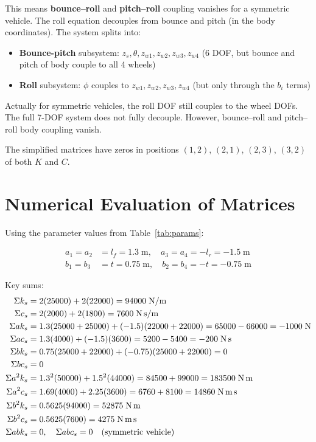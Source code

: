 \documentclass[11pt]{article}
\def\vect#1{#1}%
\newcommand{\vect}[1]{\bm{#1}}
\begin{document}
This means \textbf{bounce--roll} and \textbf{pitch--roll} coupling vanishes for a symmetric vehicle. The roll equation decouples from bounce and pitch (in the body coordinates). The system splits into:
\begin{itemize}[nosep]
  \item \textbf{Bounce-pitch} subsystem: $z_s, \theta, z_{w1}, z_{w2}, z_{w3}, z_{w4}$ (6 DOF, but bounce and pitch of body couple to all 4 wheels)
  \item \textbf{Roll} subsystem: $\phi$ couples to $z_{w1}, z_{w2}, z_{w3}, z_{w4}$ (but only through the $b_i$ terms)
\end{itemize}

Actually for symmetric vehicles, the roll DOF still couples to the wheel DOFs. The full 7-DOF system does not fully decouple. However, bounce--roll and pitch--roll body coupling vanish.

The simplified matrices have zeros in positions $(1,2)$, $(2,1)$, $(2,3)$, $(3,2)$ of both $\vect{K}$ and $\vect{C}$.

\section{Numerical Evaluation of Matrices}

Using the parameter values from Table~\ref{tab:params}:

\begin{align}
a_1 = a_2 &= l_f = 1.3\;\text{m}, \quad a_3 = a_4 = -l_r = -1.5\;\text{m} \\
b_1 = b_3 &= t = 0.75\;\text{m}, \quad b_2 = b_4 = -t = -0.75\;\text{m}
\end{align}

Key sums:
\begin{align}
\Sigma k_s &= 2(25000) + 2(22000) = 94000 \;\text{N/m} \\
\Sigma c_s &= 2(2000) + 2(1800) = 7600 \;\text{N\,s/m} \\
\Sigma a k_s &= 1.3(25000+25000) + (-1.5)(22000+22000) = 65000 - 66000 = -1000 \;\text{N} \\
\Sigma a c_s &= 1.3(4000) + (-1.5)(3600) = 5200 - 5400 = -200 \;\text{N\,s} \\
\Sigma b k_s &= 0.75(25000+22000) + (-0.75)(25000+22000) = 0 \\
\Sigma b c_s &= 0 \\
\Sigma a^2 k_s &= 1.3^2(50000) + 1.5^2(44000) = 84500 + 99000 = 183500 \;\text{N\,m} \\
\Sigma a^2 c_s &= 1.69(4000) + 2.25(3600) = 6760 + 8100 = 14860 \;\text{N\,m\,s} \\
\Sigma b^2 k_s &= 0.5625(94000) = 52875 \;\text{N\,m} \\
\Sigma b^2 c_s &= 0.5625(7600) = 4275 \;\text{N\,m\,s} \\
\Sigma ab k_s &= 0, \quad \Sigma ab c_s = 0 \quad (\text{symmetric vehicle})
\end{align}
\end{document}
